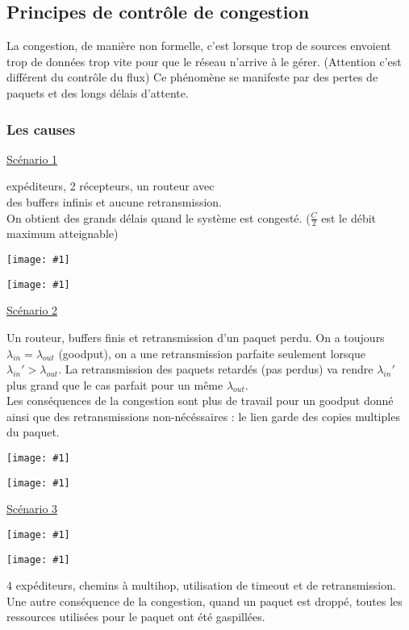 \documentclass{article}
\newcommand{\imgR}[2]{\begin{center}\texttt{[image: \#1]}\end{center}}
\begin{document}
\subsection{Principes de contrôle de congestion}

La congestion, de manière non formelle, c'est lorsque trop de sources envoient trop de données trop vite pour 
que le réseau n'arrive à le gérer. (Attention c'est différent du contrôle du flux) Ce phénomène se manifeste par
des pertes de paquets et des longs délais d'attente.

\subsubsection{Les causes}

\noindent\underline{Scénario 1}
\begin{multicols}{2}
 expéditeurs, 2 récepteurs, un routeur avec \\
des buffers infinis et aucune retransmission. \\
On obtient des grands délais quand le système est congesté. ($\frac{C}{2}$ est le débit maximum atteignable)
\imgR{CN_056.png}{260}
\end{multicols}

\imgR{CN_057.png}{200}

\noindent\underline{Scénario 2}
\begin{multicols}{2}
Un routeur, buffers finis et retransmission d'un paquet perdu.
On a toujours $\lambda_{in}=\lambda_{out}$ (goodput), on a une retransmission parfaite seulement lorsque 
$\lambda_{in}'>\lambda_{out}$. La retransmission des paquets retardés (pas perdus) va rendre $\lambda_{in}'$ 
plus grand que le cas parfait pour un même $\lambda_{out}$. \\
Les conséquences de la congestion sont plus de travail pour un goodput donné ainsi que des retransmissions 
non-nécéssaires : le lien garde des copies multiples du paquet.
\imgR{CN_058.png}{260}
\end{multicols}

\imgR{CN_059.png}{300}

\noindent\underline{Scénario 3}

\begin{multicols}{2}
\imgR{CN_060.png}{240}
\imgR{CN_061.png}{200}
\end{multicols}

4 expéditeurs, chemins à multihop, utilisation de timeout et de retransmission.
Une autre conséquence de la congestion, quand un paquet est droppé, toutes les ressources utilisées pour le 
paquet ont été gaspillées.
\end{document}
